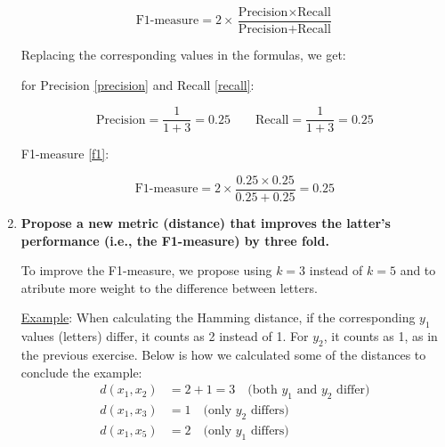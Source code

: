 \documentclass[12pt]{article}
\begin{document}
\begin{enumerate}[leftmargin=\labelsep]
    \begin{equation}\label{f1}
        \text{F1-measure} = 2 \times \frac{{\text{Precision} \times \text{Recall}}}{{\text{Precision} + \text{Recall}}}
    \end{equation}

    \vspace{10pt}
    Replacing the corresponding values in the formulas, we get:

    \vspace{10pt}
    for Precision \eqref{precision} and Recall \eqref{recall}:

    \begin{equation*}
        \text{Precision} = \frac{1}{1 + 3} = 0.25 \quad \quad
        \text{Recall} = \frac{1}{1 + 3} = 0.25
    \end{equation*}

    F1-measure \eqref{f1}:

    \begin{equation*}
        \text{F1-measure} = 2 \times \frac{0.25 \times 0.25}{0.25 + 0.25} = 0.25
    \end{equation*}

    \newpage
    \item \textbf{Propose a new metric (distance) that improves the latter's performance (i.e., the
    F1-measure) by three fold.} 
    
    \vspace{10pt}
    
    To improve the F1-measure, we propose using $k=3$ instead of $k=5$ and to atribute more weight to the difference between letters. 
    
    \vspace{10pt}
    \underline{Example}: When calculating the Hamming distance, if the corresponding $y_1$ values (letters) differ, it counts as 2 instead of 1. For $y_2$, it counts as 1, as in the previous exercise. Below is how we calculated some of the distances to conclude the example:
    \vspace{10pt}
    \begin{align*}
        d(x_1, x_2) &= 2 + 1 = 3 \quad \text{(both } y_1 \text{ and } y_2 \text{ differ)} \\
        d(x_1, x_3) &= 1 \quad \text{(only } y_2 \text{ differs)} \\
        d(x_1, x_5) &= 2 \quad \text{(only } y_1 \text{ differs)}
    \end{align*}
    

\end{enumerate}
\end{document}
